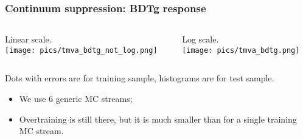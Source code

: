 \documentclass[10 pt,compress,mathserif]{beamer}
\begin{document}
\begin{frame}[containsverbatim]
 \frametitle{Continuum suppression: BDTg response}
 \begin{center}
 \begin{columns}
  \begin{column}{0.5\textwidth}
   Linear scale.\\
   \texttt{[image: pics/tmva\_bdtg\_not\_log.png]}\\
  \end{column}
  \begin{column}{0.5\textwidth}
   Log scale.\\
   \texttt{[image: pics/tmva\_bdtg.png]}\\
  \end{column}
 \end{columns}

  Dots with errors are for training sample, histograms are for test sample.
 \end{center}
 \begin{itemize}
  \item We use $6$ generic MC streams;
  \item Overtraining is still there, but it is much smaller than for a single training MC stream.
 \end{itemize}

\end{frame}
\end{document}
